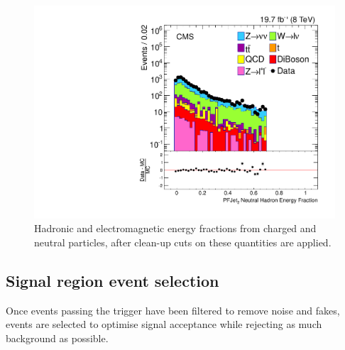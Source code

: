 \begin{figure}[!Hhtb]
\begin{center}
  \includegraphics[scale=0.30]     {Figures/sus13009/cut/PFAK5JetNeuHadEngFrac2.pdf}
  \caption{Hadronic and electromagnetic energy fractions from charged 
and neutral particles, after clean-up cuts on these quantities are 
applied.}
         \label{fig:ANA_energy_fraction_cleanup_cut}
  \end{center}
\end{figure}


\subsection{Signal region event selection}

Once events passing the trigger have been filtered to remove noise and fakes, 
events are selected to optimise signal acceptance while rejecting as much background as possible.

